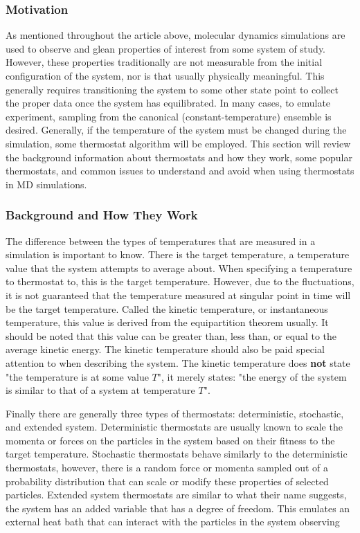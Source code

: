 \documentclass[9pt,bestpractices]{livecoms}
\begin{document}
\subsubsection{Motivation}
As mentioned throughout the article above, molecular dynamics simulations
are used to observe and glean properties of interest from some system of
study.
However, these properties traditionally are not measurable from the
initial configuration of the system, nor is that usually physically meaningful.
This generally requires transitioning the system to some other state point to
collect the proper data once the system has equilibrated.
In many cases, to emulate experiment, sampling from
the canonical (constant-temperature) ensemble is 
desired\cite{thermostatAlgorithms2005}.
Generally, if the temperature of the system must be changed during the
simulation, some thermostat algorithm will be employed.
This section will review the background information about
thermostats and how they work, some popular thermostats, and
common issues to understand and avoid when using thermostats
in MD simulations.

\subsubsection{Background and How They Work}
The difference between the types of temperatures that are measured in
a simulation is important to know.
There is the target temperature, a temperature value that the system
attempts to average about.
When specifying a temperature to thermostat
to, this is the target temperature.
However, due to the fluctuations, it is not
guaranteed that the temperature measured at singular point in time will be the 
target temperature.
Called the kinetic temperature, or instantaneous temperature, this value is
derived from the equipartition theorem usually.
It should be noted that this value can be greater than, less than, or equal
to the average kinetic energy. The kinetic temperature should also be
paid special attention to when describing the system.
The kinetic temperature does \textbf{not} state "the temperature is at
some value $T$", it merely states: "the energy of the system is similar to that
of a system at temperature $T$".

Finally there are generally three types of thermostats: deterministic,
stochastic, and extended system.
Deterministic thermostats are usually known to scale the momenta or forces 
on the particles in the system based on their fitness to the target temperature.
Stochastic thermostats behave similarly to the deterministic thermostats,
however, there is a random force or momenta sampled out of a probability 
distribution that can scale or modify these properties of selected particles.
Extended system thermostats are similar to what their name suggests,
the system has an added variable that has a degree of freedom.
This emulates an external heat bath that can interact with the particles in the
system observing 
\end{document}
